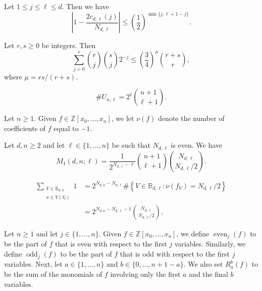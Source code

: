 \documentclass[10pt,a4paper]{amsart}
\DeclareMathOperator{\even}{even}
\DeclareMathOperator{\odd}{odd}
\newcommand{\ZZ}{\mathbb{Z}}
\renewcommand{\geq}{\geqslant}
\renewcommand{\leq}{\leqslant}
\begin{document}
\begin{lemma}
\label{Lemma coefficients}
Let $1\leq j\leq \ell \leq d$. Then we have 
\begin{equation*}
\left|1- \frac{2c_{d,\ell}(j)}{N_{d,\ell}}\right|  \leq \left( \frac{1}{2} \right)^{\min \{ j, \ell+1-j \}}.
\end{equation*}
\end{lemma}

\begin{lemma}\label{lem:prob}
Let $r,s\geq 0$ be integers. Then 
$$
\sum_{j=0}^r\binom{r}{j}\binom{s}{j} 2^{-j}\leq \left(\frac{3}{4}\right)^\mu \binom{r+s}{r},
$$
where $\mu=rs/(r+s).$
\end{lemma}

\begin{equation}
\label{Cardinality Unl}
\# U_{n,\ell} = 2^{\ell} \binom{n+1}{\ell+1}.
\end{equation}

\begin{definition}\label{def-f}
Let $n\geq 1$. Given $f\in \ZZ[x_0,\dots,x_n]$, we let $\nu(f)$ denote the number of coefficients of $f$ equal to $-1$.
\end{definition}

\begin{lemma}
\label{Lemma first moment}
Let $d, n \geq 2$ and let $\ell \in \{1, \dots, n\}$ be such that $N_{d,\ell}$ is even. We have
\begin{equation*}
M_1(d,n;\ell) = \frac1{2^{N_{d,\ell}-\ell}}  \binom{n+1}{\ell+1}\binom{N_{d,\ell}}{N_{d,\ell}/2}.
\end{equation*}
\end{lemma}

\begin{equation}\label{eq:3.2}
\begin{split}
\sum_{\substack{V \in \mathbb{B}_{d,n} \\ x \in V(\mathbb{Q})}} 1
&=
2^{N_{d,n}-N_{d,\ell}}
\#\left\{
V \in \mathbb{B}_{d,\ell}: \nu(f_V)=N_{d,\ell}/2\right\}\\
&=2^{N_{d,n}-N_{d,\ell}-1} \binom{N_{d,\ell}}{N_{d,\ell}/2},
\end{split}
\end{equation}

\begin{definition}\label{def-f'}
Let $n\geq 1$
and let $j\in \{1,\dots,n\}.$
Given $f\in \ZZ[x_0,\dots,x_n]$, we define  $\even_j(f)$ to be the part of $f$ that is 
even with  respect to the first $j$ variables. Similarly, we define 
$\odd_j(f)$ to be the part of $f$ that is  odd  with respect to the first $j$ variables. 
Next, let 
$a\in \{1,\dots,n\}$ and  $b\in \{0,\dots,n+1-a\}$.
We also set $R_a^b(f)$ to be the sum of the monomials of $f$ involving only the first $a$ and the final $b$ variables.
\end{definition}
\end{document}
